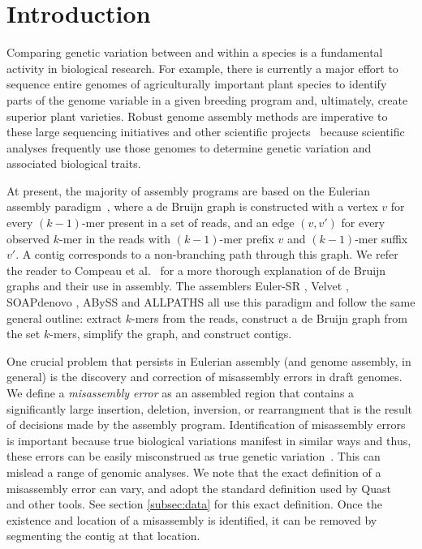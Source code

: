 \section{Introduction} \label{sec:intro}
Comparing genetic variation between and within a species is a fundamental activity in biological research. For example,  there is currently a major effort to sequence entire genomes of agriculturally important plant species to identify parts of the genome variable in a given breeding program and, ultimately, create superior plant varieties. Robust genome assembly methods are imperative to these large sequencing initiatives and other scientific projects~\cite{haussler2008genome,robinson2011creating,1001_arabidopsis,hmp} because scientific analyses frequently use those genomes to determine genetic variation and associated biological traits. 

At present, the majority of assembly programs are based on the Eulerian assembly paradigm~\cite{IW95,PTW}, where a de Bruijn graph is constructed with a vertex $v$ for every $(k - 1)$-mer present in a set of reads, and an edge $(v, v')$ for every observed $k$-mer in the reads with $(k - 1)$-mer prefix $v$ and $(k - 1)$-mer suffix $v'$. A contig corresponds to a non-branching path through this graph. We refer the reader to Compeau et al.~\cite{compeau} for a more thorough explanation of de Bruijn graphs and their use in assembly.  The assemblers Euler-SR \cite{Chaisson:2008}, Velvet \cite{Zerbino:2008}, SOAPdenovo \cite{soap}, ABySS \cite{Simpson:2009} and ALLPATHS \cite{Butler:2008} all use this paradigm and follow the same general outline: extract $k$-mers from the reads, construct a de Bruijn graph from the set $k$-mers, simplify the graph, and construct contigs.  

One crucial problem that persists in Eulerian assembly (and genome assembly, in general) is the discovery and correction of misassembly errors in draft genomes.  
We define a {\em misassembly error} as an assembled region that contains a significantly large insertion, deletion, inversion, or rearrangment that is the result of decisions made by the assembly program.  Identification of misassembly errors is important because true biological variations manifest in similar ways and thus, these errors can be easily misconstrued as true genetic variation~\cite{salzberg}. This can mislead a range of genomic analyses.  
We note that the exact definition of a misassembly error can vary, and adopt the standard definition used by Quast~\cite{quast} and other tools.  See section \ref{subsec:data} for this exact definition.  
Once the existence and 
location of a misassembly 
is identified, 
it
can be removed by segmenting the contig at that location.

